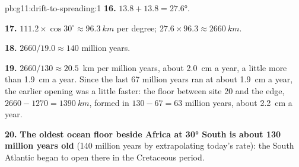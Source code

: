 \begin{solution}{pb:g11:drift-to-spreading:1}
\textbf{16.} $13.8 + 13.8 = \ang{27.6}$.

\textbf{17.} $111.2 \times \cos 30^\circ \approx \qty{96.3}{km}$ per degree;
$27.6 \times 96.3 \approx \qty{2660}{km}$.

\textbf{18.} $2660/19.0 \approx 140$ million years.

\textbf{19.} $2660/130 \approx \num{20.5}$~km per million years, about
\qty{2.0}{cm} a year, a little more than \qty{1.9}{cm} a year. Since the last
67 million years ran at about \qty{1.9}{cm} a year, the earlier opening was a
little faster: the floor between site 20 and the edge, $2660 - 1270 =
\qty{1390}{km}$, formed in $130 - 67 = 63$ million years, about
\qty{2.2}{cm} a year.

\textbf{20.} \textbf{The oldest ocean floor beside Africa at \ang{30} South
is about 130 million years old} (140 million years by extrapolating today's
rate): the South Atlantic began to open there in the Cretaceous period.
\end{solution}
